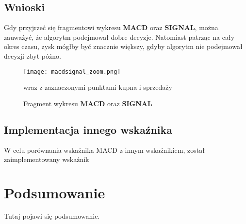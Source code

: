 \documentclass{article}
\begin{document}
    
    \subsection{Wnioski}
    Gdy przyjrzeć się fragmentowi wykresu \textbf{MACD} oraz \textbf{SIGNAL}, można zauważyć, że
    algorytm podejmował dobre decyzje. Natomiast patrząc na cały okres czasu, zysk mógłby być
    znacznie większy, gdyby algorytm nie podejmował decyzji zbyt późno.

    \begin{figure}[H]
        \texttt{[image: macdsignal\_zoom.png]}
        \centering
        \caption{Fragment wykresu \textbf{MACD} oraz \textbf{SIGNAL}}{ wraz z zaznaczonymi punktami kupna i sprzedaży}
    \end{figure}

    \subsection{Implementacja innego wskaźnika}
    W celu porównania wskaźnika MACD z innym wskaźnikiem, został zaimplementowany wskaźnik

    \section{Podsumowanie}
    Tutaj pojawi się podsumowanie.
\end{document}
